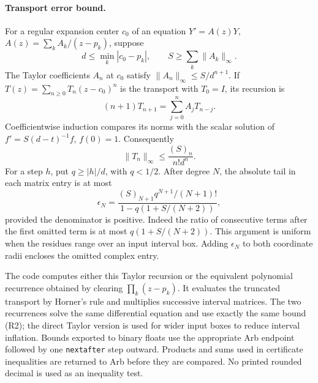 \paragraph{Transport error bound.}
For a regular expansion center $c_0$ of an equation
$Y'=A(z)Y$, $A(z)=\sum_k A_k/(z-p_k)$, suppose
\[
d\le\min_k|c_0-p_k|,\qquad S\ge\sum_k\|A_k\|_\infty.
\]
The Taylor coefficients $A_n$ at $c_0$ satisfy
$\|A_n\|_\infty\le S/d^{n+1}$. If
$T(z)=\sum_{n\ge0}T_n(z-c_0)^n$ is the transport with $T_0=I$,
its recursion is
\[
(n+1)T_{n+1}=\sum_{j=0}^n A_jT_{n-j}.
\]
Coefficientwise induction compares its norms with the scalar solution
of $f'=S(d-t)^{-1}f$, $f(0)=1$. Consequently
\[
\|T_n\|_\infty\le\frac{(S)_n}{n!d^n}.
\]
For a step $h$, put $q\ge|h|/d$, with $q<1/2$. After degree $N$,
the absolute tail in each matrix entry is at most
\[
\epsilon_N=
\frac{(S)_{N+1}q^{N+1}/(N+1)!}
 {1-q(1+S/(N+2))},
\tag{R2}
\]
provided the denominator is positive. Indeed the ratio of consecutive
terms after the first omitted term is at most
$q(1+S/(N+2))$. This argument is uniform when the residues range
over an input interval box. Adding $\epsilon_N$ to both coordinate
radii encloses the omitted complex entry.

The code computes either this Taylor recursion or the equivalent
polynomial recurrence obtained by clearing
$\prod_k(z-p_k)$. It evaluates the truncated transport by Horner's
rule and multiplies successive interval matrices. The two recurrences
solve the same differential equation and use exactly the same bound
(R2); the direct Taylor version is used for wider input boxes to
reduce interval inflation. Bounds exported to binary floats use the
appropriate Arb endpoint followed by one \texttt{nextafter} step
outward. Products and sums used in certificate inequalities are
returned to Arb before they are compared. No printed rounded decimal
is used as an inequality test.

